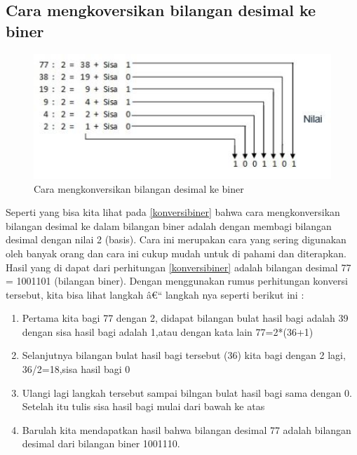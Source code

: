 \subsection{Cara mengkoversikan bilangan desimal ke biner}
\begin{figure}[ht]
\centerline{\includegraphics[width=1\textwidth]{figures/konversibiner.JPG}}
\caption{Cara mengkonversikan bilangan desimal ke biner}
\label{Contoh Konversi Bilangan Desimal}
\end{figure}
Seperti yang bisa kita lihat pada \ref{konversibiner} bahwa cara mengkonversikan bilangan desimal ke dalam bilangan biner adalah dengan membagi bilangan desimal dengan nilai 2 (basis). Cara ini merupakan cara yang sering digunakan oleh banyak orang dan cara ini cukup mudah untuk di pahami dan diterapkan. Hasil yang di dapat dari perhitungan \ref{konversibiner} adalah bilangan desimal 77 = 1001101 (bilangan biner). Dengan menggunakan rumus perhitungan konversi tersebut, kita bisa lihat langkah â€“ langkah nya seperti berikut ini : 
\begin{enumerate}
	\item Pertama kita bagi 77 dengan 2, didapat bilangan bulat hasil bagi adalah 39 dengan sisa hasil bagi adalah 1,atau dengan kata lain 77=2*(36+1)
	\item Selanjutnya bilangan bulat hasil bagi tersebut (36) kita bagi dengan 2 lagi, 36/2=18,sisa hasil bagi 0
	\item Ulangi lagi langkah tersebut sampai bilngan bulat hasil bagi sama dengan 0. Setelah itu tulis sisa hasil bagi mulai dari bawah ke atas
	\item Barulah kita mendapatkan hasil bahwa bilangan desimal 77 adalah bilangan desimal dari bilangan biner 1001110.
\end{enumerate}

